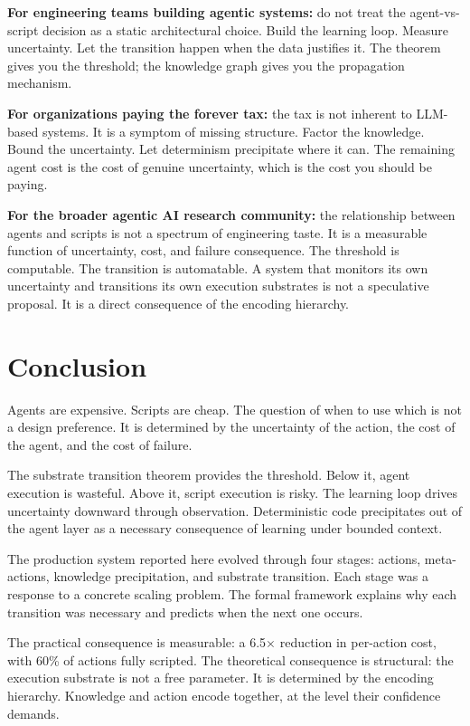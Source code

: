\documentclass[11pt]{article}
\theoremstyle{definition}
\begin{document}
\textbf{For engineering teams building agentic systems:} do not treat
the agent-vs-script decision as a static architectural choice. Build
the learning loop. Measure uncertainty. Let the transition happen when
the data justifies it. The theorem gives you the threshold; the
knowledge graph gives you the propagation mechanism.

\textbf{For organizations paying the forever tax:} the tax is not
inherent to LLM-based systems. It is a symptom of missing structure.
Factor the knowledge. Bound the uncertainty. Let determinism
precipitate where it can. The remaining agent cost is the cost of
genuine uncertainty, which is the cost you should be paying.

\textbf{For the broader agentic AI research community:} the
relationship between agents and scripts is not a spectrum of
engineering taste. It is a measurable function of uncertainty, cost,
and failure consequence. The threshold is computable. The transition
is automatable. A system that monitors its own uncertainty and
transitions its own execution substrates is not a speculative
proposal. It is a direct consequence of the encoding hierarchy.

\section{Conclusion}
\label{sec:conclusion}

Agents are expensive. Scripts are cheap. The question of when to use
which is not a design preference. It is determined by the uncertainty
of the action, the cost of the agent, and the cost of failure.

The substrate transition theorem provides the threshold. Below it,
agent execution is wasteful. Above it, script execution is risky. The
learning loop drives uncertainty downward through observation.
Deterministic code precipitates out of the agent layer as a necessary
consequence of learning under bounded context.

The production system reported here evolved through four stages:
actions, meta-actions, knowledge precipitation, and substrate
transition. Each stage was a response to a concrete scaling problem.
The formal framework explains why each transition was necessary and
predicts when the next one occurs.

The practical consequence is measurable: a 6.5$\times$ reduction in
per-action cost, with 60\% of actions fully scripted. The theoretical consequence is structural:
the execution substrate is not a free parameter. It is determined by
the encoding hierarchy. Knowledge and action encode together, at the
level their confidence demands.
\end{document}
